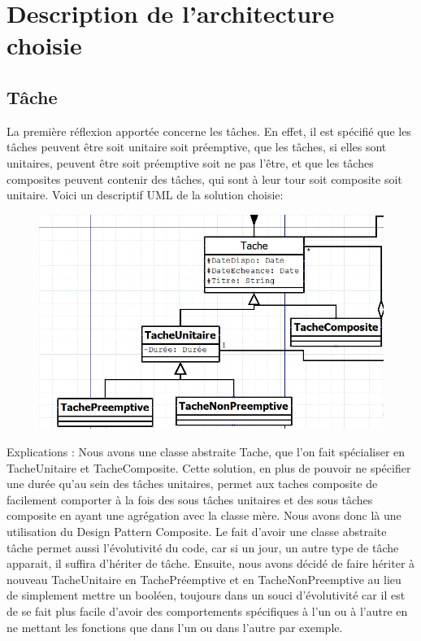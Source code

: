 \clanguage

\chapter{Description de l'architecture choisie}
\section{Tâche}
La première réflexion apportée concerne les tâches. En effet, il est spécifié que les tâches peuvent être soit unitaire soit préemptive, que les tâches, si elles sont unitaires, peuvent être soit préemptive soit ne pas l’être, et que les tâches composites peuvent contenir des tâches, qui sont à leur tour soit composite soit unitaire. 
Voici un descriptif UML de la solution choisie:

\begin{figure}[h]
	\includegraphics[scale=0.5]{ressources/figure1.png}
\end{figure}

Explications : Nous avons une classe abstraite Tache, que l’on fait spécialiser en TacheUnitaire et TacheComposite. Cette solution, en plus de pouvoir ne spécifier une durée qu’au sein des tâches unitaires, permet aux taches composite de facilement comporter à la fois des sous tâches unitaires et des sous tâches composite en ayant une agrégation avec la classe mère. Nous avons donc là une utilisation du Design Pattern Composite. Le fait d’avoir une classe abstraite tâche permet aussi l’évolutivité du code, car si un jour, un autre type de tâche apparait, il suffira d’hériter de tâche.
Ensuite, nous avons décidé de faire hériter à nouveau TacheUnitaire en TachePréemptive et en TacheNonPreemptive au lieu de simplement mettre un booléen, toujours dans un souci d’évolutivité car il est de se fait plus facile d’avoir des comportements spécifiques à l’un ou à l’autre en ne mettant les fonctions que dans l’un ou dans l’autre par exemple. 

